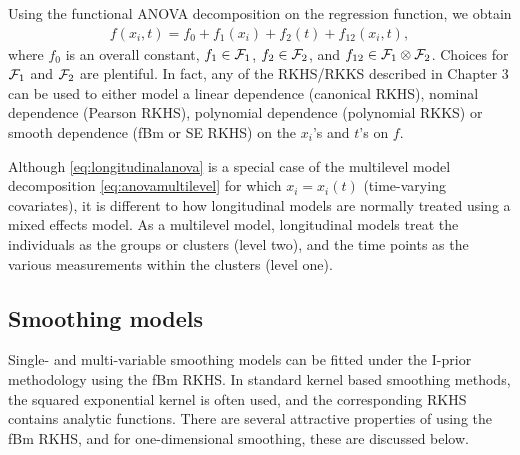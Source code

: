 Using the functional ANOVA decomposition on the regression function, we obtain
\begin{align}\label{eq:longitudinalanova}
  f(x_i,t) = f_0 + f_1(x_i) + f_2(t) + f_{12}(x_i,t),
\end{align}
where $f_0$ is an overall constant, $f_1\in{\mathcal F}_1$, $f_2\in{\mathcal F}_2$, and $f_{12}\in{\mathcal F}_1\otimes{\mathcal F}_2$.
Choices for ${\mathcal F}_1$ and ${\mathcal F}_2$ are plentiful.
In fact, any of the RKHS/RKKS described in Chapter 3 can be used to either model a linear dependence (canonical RKHS), nominal dependence (Pearson RKHS), polynomial dependence (polynomial RKKS) or smooth dependence (fBm or SE RKHS) on the $x_i$'s and $t$'s on $f$.

\begin{remark}
  Although \cref{eq:longitudinalanova} is a special case of the multilevel model decomposition \cref{eq:anovamultilevel} for which $x_i = x_i(t)$ (time-varying covariates), it is different to how longitudinal models are normally treated using a mixed effects model.
  As a multilevel model, longitudinal models treat the individuals as the groups or clusters (level two), and the time points as the various measurements within the clusters (level one).
\end{remark}

\subsection{Smoothing models}

Single- and multi-variable smoothing models can be fitted under the I-prior methodology using the fBm RKHS.
In standard kernel based smoothing methods, the squared exponential kernel is often used, and the corresponding RKHS contains analytic functions.
There are several attractive properties of using the fBm RKHS, and for one-dimensional smoothing, these are discussed below.

